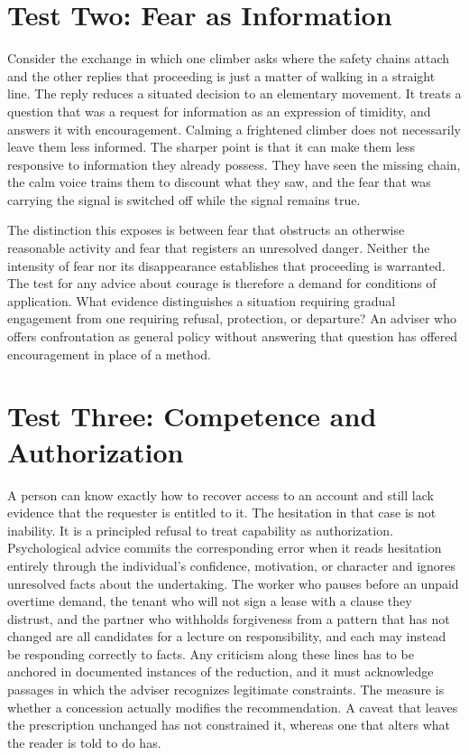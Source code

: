 \documentclass[12pt]{article}
\begin{document}
\section{Test Two: Fear as Information}\label{sec:t2}

Consider the exchange in which one climber asks where the safety chains attach and the other replies that proceeding is just a matter of walking in a straight line. The reply reduces a situated decision to an elementary movement. It treats a question that was a request for information as an expression of timidity, and answers it with encouragement. Calming a frightened climber does not necessarily leave them less informed. The sharper point is that it can make them less responsive to information they already possess. They have seen the missing chain, the calm voice trains them to discount what they saw, and the fear that was carrying the signal is switched off while the signal remains true.

The distinction this exposes is between fear that obstructs an otherwise reasonable activity and fear that registers an unresolved danger. Neither the intensity of fear nor its disappearance establishes that proceeding is warranted. The test for any advice about courage is therefore a demand for conditions of application. What evidence distinguishes a situation requiring gradual engagement from one requiring refusal, protection, or departure? An adviser who offers confrontation as general policy without answering that question has offered encouragement in place of a method.

\section{Test Three: Competence and Authorization}\label{sec:t3}

A person can know exactly how to recover access to an account and still lack evidence that the requester is entitled to it. The hesitation in that case is not inability. It is a principled refusal to treat capability as authorization. Psychological advice commits the corresponding error when it reads hesitation entirely through the individual's confidence, motivation, or character and ignores unresolved facts about the undertaking. The worker who pauses before an unpaid overtime demand, the tenant who will not sign a lease with a clause they distrust, and the partner who withholds forgiveness from a pattern that has not changed are all candidates for a lecture on responsibility, and each may instead be responding correctly to facts. Any criticism along these lines has to be anchored in documented instances of the reduction, and it must acknowledge passages in which the adviser recognizes legitimate constraints. The measure is whether a concession actually modifies the recommendation. A caveat that leaves the prescription unchanged has not constrained it, whereas one that alters what the reader is told to do has.
\end{document}
